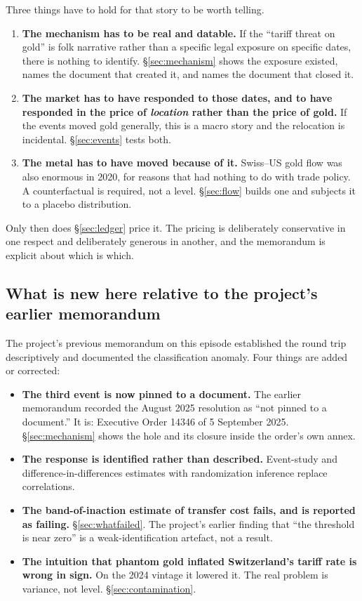 \documentclass[11pt,a4paper]{article}
\begin{document}
Three things have to hold for that story to be worth telling.

\begin{enumerate}[leftmargin=*]
\item \textbf{The mechanism has to be real and datable.} If the ``tariff threat on gold'' is
folk narrative rather than a specific legal exposure on specific dates, there is nothing to
identify. \S\ref{sec:mechanism} shows the exposure existed, names the document that created it,
and names the document that closed it.

\item \textbf{The market has to have responded to those dates, and to have responded in the
price of \emph{location} rather than the price of gold.} If the events moved gold generally,
this is a macro story and the relocation is incidental. \S\ref{sec:events} tests both.

\item \textbf{The metal has to have moved because of it.} Swiss--US gold flow was also enormous
in 2020, for reasons that had nothing to do with trade policy. A counterfactual is required, not
a level. \S\ref{sec:flow} builds one and subjects it to a placebo distribution.
\end{enumerate}

Only then does \S\ref{sec:ledger} price it. The pricing is deliberately conservative in one
respect and deliberately generous in another, and the memorandum is explicit about which is
which.

\subsection{What is new here relative to the project's earlier memorandum}

The project's previous memorandum on this episode established the round trip descriptively and
documented the classification anomaly. Four things are added or corrected:

\begin{itemize}[leftmargin=*]
\item \textbf{The third event is now pinned to a document.} The earlier memorandum recorded the
August 2025 resolution as ``not pinned to a document.'' It is: Executive Order 14346 of
5 September 2025. \S\ref{sec:mechanism} shows the hole and its closure inside the order's own
annex.
\item \textbf{The response is identified rather than described.} Event-study and
difference-in-differences estimates with randomization inference replace correlations.
\item \textbf{The band-of-inaction estimate of transfer cost fails, and is reported as
failing.} \S\ref{sec:whatfailed}. The project's earlier finding that ``the threshold is near
zero'' is a weak-identification artefact, not a result.
\item \textbf{The intuition that phantom gold inflated Switzerland's tariff rate is wrong in
sign.} On the 2024 vintage it lowered it. The real problem is variance, not level.
\S\ref{sec:contamination}.
\end{itemize}
\end{document}
